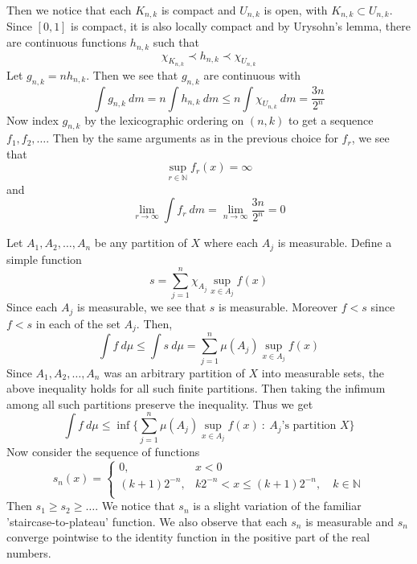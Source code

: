 \documentclass[12pt]{exam}
\theoremstyle{plain} %
\theoremstyle{definition} %
\theoremstyle{remark} %
\begin{document}
\begin{questions}
\begin{solution}
    Then we notice that each $K_{n, k}$ is compact and $U_{n, k}$ is
    open, with $K_{n, k} \subset U_{n, k}$. Since $[0, 1]$ is
    compact, it is also locally compact and by Urysohn's lemma, there
    are continuous functions $h_{n, k}$ such that \[
      \chi_{K_{n, k}} \prec h_{n, k} \prec \chi_{U_{n, k}}
    \]
    Let $g_{n, k} = n h_{n, k}$. Then we see that $g_{n, k}$ are
    continuous with \[
      \int  g_{n, k} \ d m = n \int  h_{n, k} \ d m \le n \int
      \chi_{U_{n, k}} \ d m = \frac{3n}{2^n}
    \]
    Now index $g_{n, k}$ by the lexicographic ordering on $(n, k)$ to
    get a sequence $  f_1, f_2, \ldots$. Then by the same arguments
    as in the previous choice for $f_r$, we see that \[
      \sup_{r \in \mathbb{N}}f_r(x) = \infty
    \]
    and \[
      \lim_{r \to \infty} \int  f_r \ d m = \lim_{n \to \infty}
      \frac{3n}{2^n} = 0
    \]
  \end{solution}

  \question
  \begin{solution}
    Let $A_1 ,  A_2 , \ldots ,  A_n$ be any partition of $X$ where
    each $A_j$ is measurable. Define a simple function \[
      s = \sum_{j = 1}^{n} \chi_{A_j}\sup_{x \in A_j}f(x)
    \]
    Since each $A_j$ is measurable, we see that $s$ is measurable.
    Moreover $f < s$ since $f< s$ in each of the set $A_j$. Then, \[
      \int f \ d \mu \le \int  s \ d \mu = \sum_{j = 1}^{n} \mu(A_j)
      \sup_{ x \in A_j} f(x)
    \]
    Since $A_1 , A_2 , \ldots , A_n$ was an arbitrary partition of
    $X$ into measurable sets, the above inequality holds for all such
    finite partitions. Then taking the infimum among all such
    partitions preserve the inequality. Thus we get \[
      \int  f \ d \mu \le \inf \Bigg\{ \sum_{j = 1}^{n} \mu(A_j)
      \sup_{ x \in A_j} f(x)\ : \ A_j \textrm{'s partition }  X \Bigg\}
    \]
    Now consider the sequence of functions \[
      s_n(x)  =
      \begin{cases}
        0, & x < 0 \\
        (k+1)2^{-n}, & k2^{-n} < x \le (k+1)2^{-n} , \quad k \in \mathbb{N}\\
      \end{cases}
    \]
    Then $s_1 \ge s_2 \ge \ldots$.  We
    notice that $s_n$ is a slight variation of the familiar
    'staircase-to-plateau' function. We also observe that each $s_n$
    is measurable and $s_n$ converge pointwise to the identity
    function in the positive part of the real numbers.


\end{solution}
\end{questions}
\end{document}
